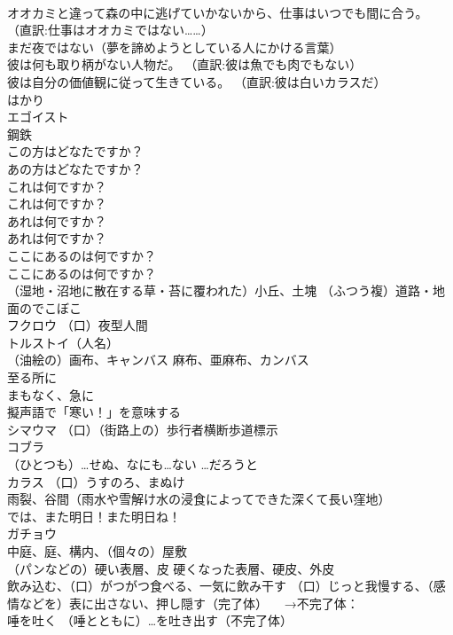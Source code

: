 \documentclass[8pt]{extreport}
\begin{document}
\begin{CJK}{UTF8}{min}
\\	オオカミと違って森の中に逃げていかないから、仕事はいつでも間に合う。 （直訳:仕事はオオカミではない……）
\\	まだ夜ではない（夢を諦めようとしている人にかける言葉）
\\	彼は何も取り柄がない人物だ。 （直訳:彼は魚でも肉でもない）
\\	彼は自分の価値観に従って生きている。 （直訳:彼は白いカラスだ）
\\	はかり
\\	エゴイスト
\\	鋼鉄
\\	この方はどなたですか？
\\	あの方はどなたですか？
\\	これは何ですか？
\\	これは何ですか？
\\	あれは何ですか？
\\	あれは何ですか？
\\	ここにあるのは何ですか？
\\	ここにあるのは何ですか？
\\	（湿地・沼地に散在する草・苔に覆われた）小丘、土塊 （ふつう複）道路・地面のでこぼこ
\\	フクロウ （口）夜型人間
\\	トルストイ（人名）
\\	（油絵の）画布、キャンバス 麻布、亜麻布、カンバス
\\	至る所に
\\	まもなく、急に
\\	擬声語で「寒い！」を意味する
\\	シマウマ （口）（街路上の）歩行者横断歩道標示
\\	コブラ
\\	（ひとつも）…せぬ、なにも…ない …だろうと
\\	カラス （口）うすのろ、まぬけ
\\	雨裂、谷間（雨水や雪解け水の浸食によってできた深くて長い窪地）
\\	では、また明日！また明日ね！
\\	ガチョウ
\\	中庭、庭、構内、（個々の）屋敷
\\	（パンなどの）硬い表層、皮 硬くなった表層、硬皮、外皮
\\	飲み込む、（口）がつがつ食べる、一気に飲み干す （口）じっと我慢する、（感情などを）表に出さない、押し隠す（完了体） 　→不完了体：
\\	唾を吐く （唾とともに）…を吐き出す（不完了体） 

\end{CJK}
\end{document}

